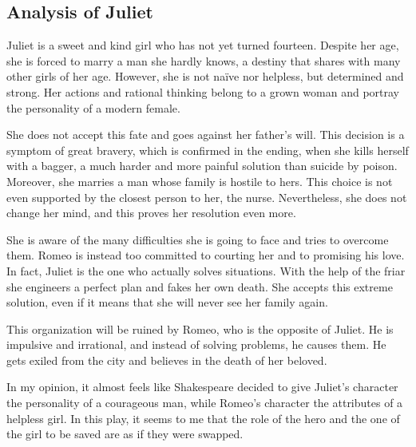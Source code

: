 \documentclass[]{article}
\begin{document}
\subsection*{Analysis of Juliet}
\hspace{1em}
Juliet is a sweet and kind girl who has not yet turned fourteen. Despite her age, she is forced to marry a man she hardly knows, a destiny that shares with many other girls of her age. However, she is not naïve nor helpless, but determined and strong. Her actions and rational thinking belong to a grown woman and portray the personality of a modern female.

She does not accept this fate and goes against her father's will. This decision is a symptom of great bravery, which is confirmed in the ending, when she kills herself with a bagger, a much harder and more painful solution than suicide by poison. Moreover, she marries a man whose family is hostile to hers. This choice is not even supported by the closest person to her, the nurse. Nevertheless, she does not change her mind, and this proves her resolution even more.

She is aware of the many difficulties she is going to face and tries to overcome them. Romeo is instead too committed to courting her and to promising his love. In fact, Juliet is the one who actually solves situations. With the help of the friar she engineers a perfect plan and fakes her own death. She accepts this extreme solution, even if it means that she will never see her family again.

This organization will be ruined by Romeo, who is the opposite of Juliet. He is impulsive and irrational, and instead of solving problems, he causes them. He gets exiled from the city and believes in the death of her beloved.

In my opinion, it almost feels like Shakespeare decided to give Juliet's character the personality of a courageous man, while Romeo's character the attributes of a helpless girl. In this play, it seems to me that the role of the hero and the one of the girl to be saved are as if they were swapped.
\end{document}
